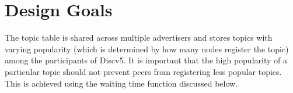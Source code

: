 \section{Design Goals}\label{sec:goals}

The topic table is shared across multiple advertisers and stores topics with varying popularity (which is determined by how many nodes register the topic) among the participants of Discv5. It is important that the high popularity of a particular topic should not prevent peers from registering less popular topics. This is achieved using the waiting time function discussed below.